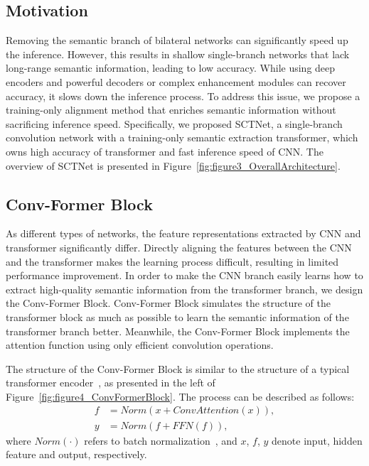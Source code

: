 \documentclass[letterpaper]{article} %
\begin{document}
\subsection{Motivation}


Removing the semantic branch of bilateral networks can significantly speed up the inference. However, this results in shallow single-branch networks that lack long-range semantic information, leading to low accuracy. While using deep encoders and powerful decoders or complex enhancement modules can recover accuracy, it slows down the inference process. To address this issue, we propose a training-only alignment method that enriches semantic information without sacrificing inference speed. Specifically, we proposed SCTNet, a single-branch convolution network with a training-only semantic extraction transformer, which owns high accuracy of transformer and fast inference speed of CNN. The overview of SCTNet is presented in Figure~\ref{fig:figure3_OverallArchitecture}. 



\subsection{Conv-Former Block}
As different types of networks, the feature representations extracted by CNN and transformer significantly differ. Directly aligning the features between the CNN and the transformer makes the learning process difficult, resulting in limited performance improvement. In order to make the CNN branch easily learns how to extract high-quality semantic information from the transformer branch, we design the Conv-Former Block. Conv-Former Block simulates the structure of the transformer block as much as possible to learn the semantic information of the transformer branch better. Meanwhile, the Conv-Former Block implements the attention function using only efficient convolution operations.

The structure of the Conv-Former Block is similar to the structure of a typical transformer encoder~\cite{vaswani2017attention}, as presented in the left of Figure~\ref{fig:figure4_ConvFormerBlock}. 
The process can be described as follows:
\begin{equation}
\label{Equ:ConvFormerBlock}
\begin{aligned}
f &= Norm(x + ConvAttention(x)),\\
y &= Norm (f + FFN(f)),
\end{aligned}
\end{equation}
where $Norm(\cdot)$ refers to  batch normalization~\cite{ioffe2015batch}, and $x$, $f$, $y$ denote input, hidden feature and output, respectively. 
\end{document}
